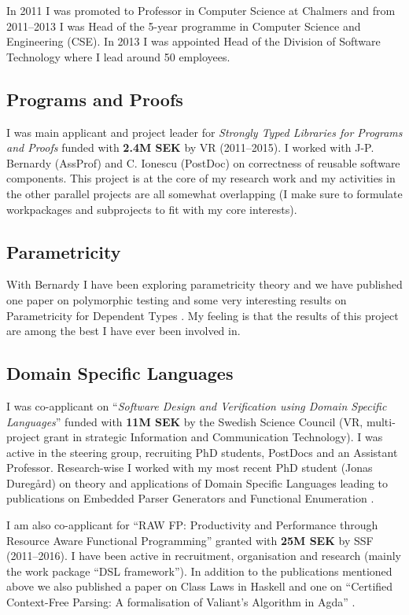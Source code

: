 \documentclass[11pt,twoside,twocolumn]{article}
\begin{document}
In 2011 I was promoted to Professor in Computer Science at Chalmers
and from 2011--2013 I was Head of the 5-year programme in Computer
Science and Engineering (CSE).
%
In 2013 I was appointed Head of the Division of Software Technology
where I lead around 50 employees.

\subsection{Programs and Proofs}

I was main applicant and project leader for \emph{Strongly Typed
  Libraries for Programs and Proofs} funded with \textbf{2.4M SEK} by
VR (2011--2015).
%
I worked with J-P. Bernardy (AssProf) and C. Ionescu (PostDoc) on
correctness of reusable software components.
%
This project is at the core of my research work and my activities in the
other parallel projects are all somewhat overlapping (I make sure to
formulate workpackages and subprojects to fit with my core interests).

\subsection{Parametricity}
With Bernardy I have been exploring parametricity theory and we have
published one paper on polymorphic testing
\citep{bernardy_testing_2010} and some very interesting results on
Parametricity for Dependent Types \citep{bernardy_parametricity_2010,
  bernardy_proofs_2012}.
%
My feeling is that the results of this project are among the best I
have ever been involved in.

\subsection{Domain Specific Languages}

I was co-applicant on ``\emph{Software Design and Verification using
  Domain Specific Languages}'' funded with \textbf{11M SEK} by the
Swedish Science Council (VR, multi-project grant in strategic
Information and Communication Technology).
%
I was active in the steering group, recruiting PhD students, PostDocs
and an Assistant Professor.
%
Research-wise I worked with my most recent PhD student (Jonas
Duregård) on theory and applications of Domain Specific Languages
leading to publications on Embedded Parser Generators
\citep{BNFC-meta-Haskell2011} and Functional Enumeration
\citep{duregardHaskell12Feat}.

I am also co-applicant for ``RAW FP: Productivity and Performance
through Resource Aware Functional Programming'' granted with \textbf{25M SEK}
by SSF (2011--2016).
%
I have been active in recruitment, organisation and research (mainly
the work package ``DSL framework'').
%
In addition to the publications mentioned above we also published a
paper on Class Laws in Haskell \citep{jeuringHaskell12ClassLaws}
%
and one on ``Certified Context-Free Parsing: A formalisation of
Valiant's Algorithm in Agda'' \citep{bernardy_certified_2015}.
\end{document}
